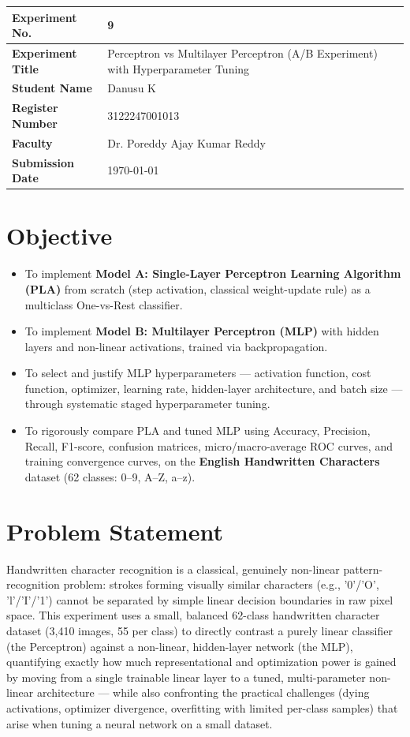 \documentclass[12pt,a4paper]{article}
\begin{document}
\noindent
\begin{tabular}{|p{3.8cm}|p{11.2cm}|}
\hline
\textbf{Experiment No.} & 9 \\ \hline
\textbf{Experiment Title} & Perceptron vs Multilayer Perceptron (A/B Experiment) with Hyperparameter Tuning\footnotemark \\ \hline
\textbf{Student Name} & Danusu K \\ \hline
\textbf{Register Number} & 3122247001013 \\ \hline
\textbf{Faculty} & Dr. Poreddy Ajay Kumar Reddy \\ \hline
\textbf{Submission Date} & \today \\ \hline
\end{tabular}

\section{Objective}
\begin{itemize}
\item To implement \textbf{Model A: Single-Layer Perceptron Learning Algorithm (PLA)} from scratch (step activation, classical weight-update rule) as a multiclass One-vs-Rest classifier.
\item To implement \textbf{Model B: Multilayer Perceptron (MLP)} with hidden layers and non-linear activations, trained via backpropagation.
\item To select and justify MLP hyperparameters — activation function, cost function, optimizer, learning rate, hidden-layer architecture, and batch size — through systematic staged hyperparameter tuning.
\item To rigorously compare PLA and tuned MLP using Accuracy, Precision, Recall, F1-score, confusion matrices, micro/macro-average ROC curves, and training convergence curves, on the \textbf{English Handwritten Characters} dataset (62 classes: 0--9, A--Z, a--z).
\end{itemize}

\section{Problem Statement}
Handwritten character recognition is a classical, genuinely non-linear pattern-recognition problem: strokes forming visually similar characters (e.g., '0'/'O', 'l'/'I'/'1') cannot be separated by simple linear decision boundaries in raw pixel space. This experiment uses a small, balanced 62-class handwritten character dataset (3,410 images, 55 per class) to directly contrast a purely linear classifier (the Perceptron) against a non-linear, hidden-layer network (the MLP), quantifying exactly how much representational and optimization power is gained by moving from a single trainable linear layer to a tuned, multi-parameter non-linear architecture — while also confronting the practical challenges (dying activations, optimizer divergence, overfitting with limited per-class samples) that arise when tuning a neural network on a small dataset.
\end{document}

